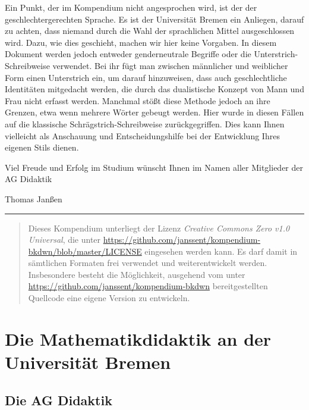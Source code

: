 \documentclass[ngerman,bibliography=totoc,oneside,12pt,a4paper]{scrbook}
\begin{document}
Ein Punkt, der im Kompendium nicht angesprochen wird, ist der der
geschlechtergerechten Sprache. Es ist der Universität Bremen ein
Anliegen, darauf zu achten, dass niemand durch die Wahl der sprachlichen
Mittel ausgeschlossen wird. Dazu, wie dies geschieht, machen wir hier
keine Vorgaben. In diesem Dokument werden jedoch entweder genderneutrale
Begriffe oder die Unterstrich-Schreibweise verwendet. Bei ihr fügt man
zwischen männlicher und weiblicher Form einen Unterstrich ein, um darauf
hinzuweisen, dass auch geschlechtliche Identitäten mitgedacht werden,
die durch das dualistische Konzept von Mann und Frau nicht erfasst
werden. Manchmal stößt diese Methode jedoch an ihre Grenzen, etwa wenn
mehrere Wörter gebeugt werden. Hier wurde in diesen Fällen auf die
klassische Schrägstrich-Schreibweise zurückgegriffen. Dies kann Ihnen
vielleicht als Anschauung und Entscheidungshilfe bei der Entwicklung
Ihres eigenen Stils dienen.

Viel Freude und Erfolg im Studium wünscht Ihnen im Namen aller
Mitglieder der AG Didaktik

Thomas Janßen

\begin{center}\rule{0.5\linewidth}{\linethickness}\end{center}

\begin{quote}
Dieses Kompendium unterliegt der Lizenz \emph{Creative Commons Zero v1.0
Universal}, die unter
\url{https://github.com/janssent/kompendium-bkdwn/blob/master/LICENSE}
eingesehen werden kann. Es darf damit in sämtlichen Formaten frei
verwendet und weiterentwickelt werden. Insbesondere besteht die
Möglichkeit, ausgehend vom unter
\url{https://github.com/janssent/kompendium-bkdwn} bereitgestellten
Quellcode eine eigene Version zu entwickeln.
\end{quote}

\chapter{Die Mathematikdidaktik an der Universität
Bremen}\label{die-mathematikdidaktik-an-der-universitat-bremen}

\section{Die AG Didaktik}\label{die-ag-didaktik}
\end{document}
